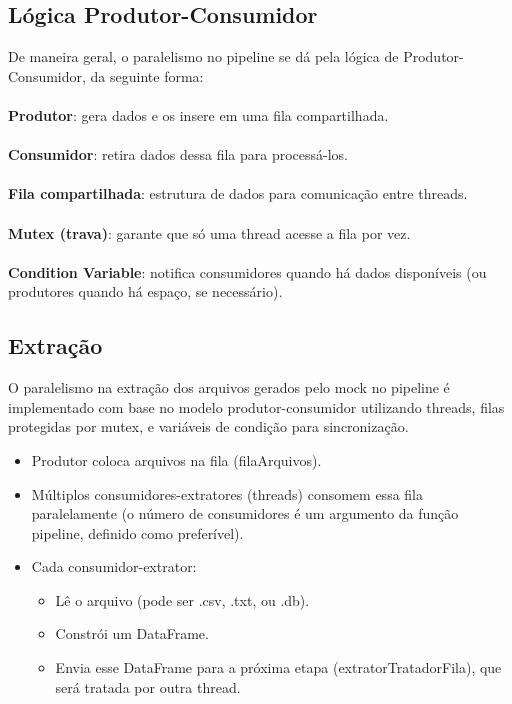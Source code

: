 \documentclass[a4paper,12pt]{article}
\begin{document}
\subsection*{Lógica Produtor-Consumidor}
De maneira geral, o paralelismo no pipeline se dá pela lógica de Produtor-Consumidor, da seguinte forma:
\\
\\
\textbf{Produtor}: gera dados e os insere em uma fila compartilhada.
\\
\\
\textbf{Consumidor}: retira dados dessa fila para processá-los.
\\
\\
\textbf{Fila compartilhada}: estrutura de dados para comunicação entre threads.
\\
\\
\textbf{Mutex (trava)}: garante que só uma thread acesse a fila por vez.
\\
\\
\textbf{Condition Variable}: notifica consumidores quando há dados disponíveis (ou produtores quando há espaço, se necessário).



\subsection*{Extração}
O paralelismo na extração dos arquivos gerados pelo mock no pipeline é implementado com base no modelo produtor-consumidor utilizando threads, filas protegidas por mutex, e variáveis de condição para sincronização.

\begin{itemize}
    \item Produtor coloca arquivos na fila (filaArquivos).

    \item  Múltiplos consumidores-extratores (threads) consomem essa fila paralelamente (o número de consumidores é um argumento da função pipeline, definido como preferível).

    \item  Cada consumidor-extrator:
    \begin{itemize}
        \item Lê o arquivo (pode ser .csv, .txt, ou .db).
        \item Constrói um DataFrame.
        \item Envia esse DataFrame para a próxima etapa (extratorTratadorFila), que será tratada por outra thread.
    \end{itemize}

\end{itemize}
\end{document}

